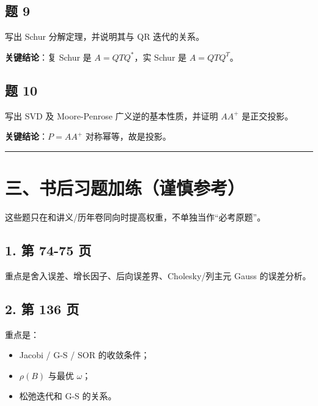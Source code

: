 \documentclass[11pt,a4paper]{ctexart}
\begin{document}

\subsection*{题 9}


写出 Schur 分解定理，并说明其与 QR 迭代的关系。

\textbf{关键结论}：复 Schur 是 $A=QTQ^*$，实 Schur 是 $A=QTQ^T$。


\subsection*{题 10}


写出 SVD 及 Moore-Penrose 广义逆的基本性质，并证明 $AA^+$ 是正交投影。

\textbf{关键结论}：$P=AA^+$ 对称幂等，故是投影。

\bigskip\hrule\bigskip


\section*{三、书后习题加练（谨慎参考）}


这些题只在和讲义/历年卷同向时提高权重，不单独当作“必考原题”。


\subsection*{1. 第 74-75 页}


重点是舍入误差、增长因子、后向误差界、Cholesky/列主元 Gauss 的误差分析。


\subsection*{2. 第 136 页}


重点是：

\begin{itemize}

\item Jacobi / G-S / SOR 的收敛条件；

\item $\rho(B)$ 与最优 $\omega$；

\item 松弛迭代和 G-S 的关系。

\end{itemize}
\end{document}
